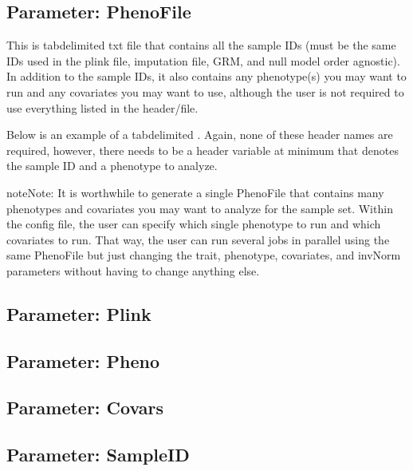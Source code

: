 \documentclass[letterpaper,10pt,english]{sphinxmanual}
\let\sphinxpxdimen\pdfpxdimen\else\newdimen\sphinxpxdimen
\begin{document}
\subsection{Parameter: PhenoFile}
\label{\detokenize{fileFormats:parameter-phenofile}}
This is tab\sphinxhyphen{}delimited txt file that contains all the sample IDs (must be the same IDs used in the plink file, imputation file, GRM, and null model \sphinxhyphen{}\sphinxhyphen{} order agnostic).  In addition to the sample IDs, it also contains any phenotype(s) you may want to run and any covariates you may want to use, although the user is not required to use everything listed in the header/file.

Below is an example of a tab\sphinxhyphen{}delimited .  Again, none of these header names are required, however, there needs to be a header variable at minimum that denotes the sample ID and a phenotype to analyze.

\noindent\sphinxincludegraphics[width=800\sphinxpxdimen]{{phenoFile}.png}

\begin{sphinxadmonition}{note}{Note:}
It is worthwhile to generate a single PhenoFile that contains many phenotypes and covariates you may want to analyze for the sample set.  Within the config file, the user can specify which single phenotype to run and which covariates to run.  That way, the user can run several jobs in parallel using the same PhenoFile but just changing the trait, phenotype, covariates, and invNorm parameters without having to change anything else.
\end{sphinxadmonition}


\subsection{Parameter: Plink}
\label{\detokenize{fileFormats:parameter-plink}}

\subsection{Parameter: Pheno}
\label{\detokenize{fileFormats:parameter-pheno}}

\subsection{Parameter: Covars}
\label{\detokenize{fileFormats:parameter-covars}}

\subsection{Parameter: SampleID}
\label{\detokenize{fileFormats:parameter-sampleid}}
\end{document}
